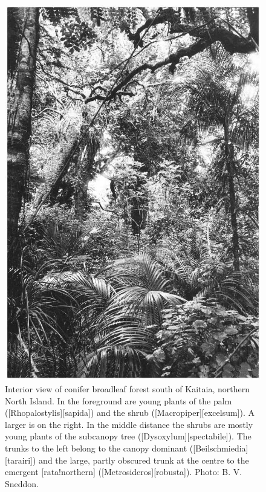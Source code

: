 \begin{figure}[!htb]
\begin{minipage}[t]{0.446\textwidth}
    	\includegraphics[width=\textwidth]{graphics/figure8conifer.jpg}
    	\caption[Interior view of conifer broadleaf forest south of Kaitaia]{Interior view of conifer broadleaf forest south of Kaitaia, northern North Island.
    	In the foreground are young plants of the  palm ([Rhopalostylis][sapida]) and the shrub  ([Macropiper][excelsum]).
    	A larger  is on the right.
    	In the middle distance the shrubs are mostly young plants of the subcanopy tree  ([Dysoxylum][spectabile]).
    	The trunks to the left belong to the canopy dominant  ([Beilschmiedia][tarairi]) and the large, partly obscured trunk at the centre to the emergent [rata!northern] ([Metrosideros][robusta]).
    	Photo: B. V. Sneddon.}%
    	\label{fig:8conifer}
	\end{minipage}
\end{figure}

